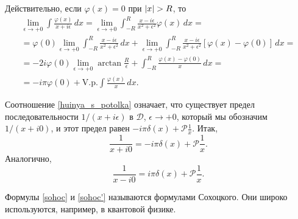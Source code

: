 Действительно, если $\varphi(x) = 0$ при $\abs{x} > R$, то 
\begin{align*}
	\lim \limits_{\epsilon \to +0} \int \frac{\varphi(x)}{x + i \epsilon} \, dx = \lim \limits_{\epsilon \to +0} \int_{-R}^{R} \frac{x - i \epsilon}{x^2 + \epsilon^2} \varphi(x) \, dx = \\
	= \varphi(0) \lim \limits_{\epsilon \to +0} \int_{-R}^{R} \frac{x - i \epsilon}{x^2 + \epsilon^2} \, dx + \lim \limits_{\epsilon \to +0} \int_{-R}^{R} \frac{x - i \epsilon}{x^2 + \epsilon^2} [\varphi(x) - \varphi(0)] \, dx = \\
	= - 2 i \varphi(0) \lim \limits_{\epsilon \to +0} \arctan{\frac{R}{\epsilon}} + \int_{-R}^{R} \frac{\varphi(x) - \varphi(0)}{x} \, dx = \\
	= - i \pi \varphi(0) + \text{V.p.} \int \frac{\varphi(x)}{x} \, dx.
\end{align*}

Соотношение \eqref{huinya_s_potolka} означает, что существует предел последовательности $1/(x + i \epsilon)$ в $\mathcal{D}$, $\epsilon \to +0$, который мы обозначим $1/(x + i0)$, и этот предел равен $-i \pi \delta(x) + \mathcal{P}{\frac{1}{x}}$. Итак,
\begin{equation}
	\label{sohoc}
	\frac{1}{x + i 0} = - i \pi \delta(x) + \mathcal{P}{\frac{1}{x}}.
\end{equation}
Аналогично, 
\begin{equation}
	\label{sohoc'}
	\frac{1}{x - i0} = i \pi \delta(x) + \mathcal{P}{\frac{1}{x}}. 
\end{equation}

Формулы \eqref{sohoc} и \eqref{sohoc'} называются формулами Сохоцкого. Они широко используются, например, в квантовой физике.



